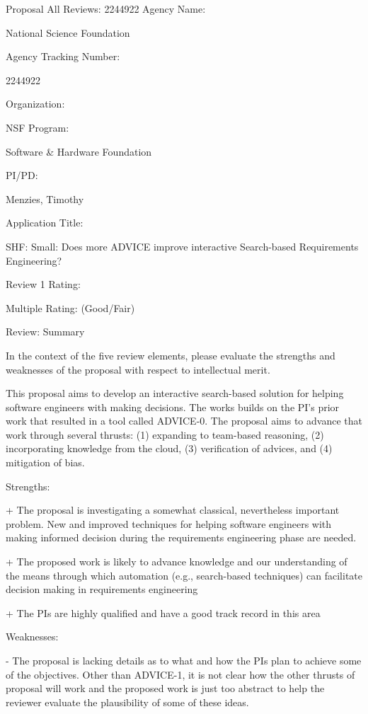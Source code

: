 Proposal All Reviews: 2244922
Agency Name:

National Science Foundation

Agency Tracking Number:

2244922

Organization:

NSF Program:

Software & Hardware Foundation

PI/PD:

Menzies, Timothy

Application Title:

SHF: Small: Does more ADVICE improve interactive Search-based Requirements Engineering?

Review 1
Rating:

Multiple Rating: (Good/Fair)

Review:
Summary

In the context of the five review elements, please
evaluate the strengths and weaknesses of the proposal with respect to intellectual merit.

This proposal aims to develop an interactive search-based solution for helping software engineers with making decisions. The works builds on the PI's prior work that resulted in a tool called ADVICE-0. The proposal aims to advance that work through several thrusts: (1) expanding to team-based reasoning, (2) incorporating knowledge from the cloud, (3) verification of advices, and (4) mitigation of bias.

Strengths:

+ The proposal is investigating a somewhat classical, nevertheless important problem. New and improved techniques for helping software engineers with making informed decision during the requirements engineering phase are needed.

+ The proposed work is likely to advance knowledge and our understanding of the means through which automation (e.g., search-based techniques) can facilitate decision making in requirements engineering

+ The PIs are highly qualified and have a good track record in this area

Weaknesses:

- The proposal is lacking details as to what and how the PIs plan to achieve some of the objectives. Other than ADVICE-1, it is not clear how the other thrusts of proposal will work and the proposed work is just too abstract to help the reviewer evaluate the plausibility of some of these ideas.

